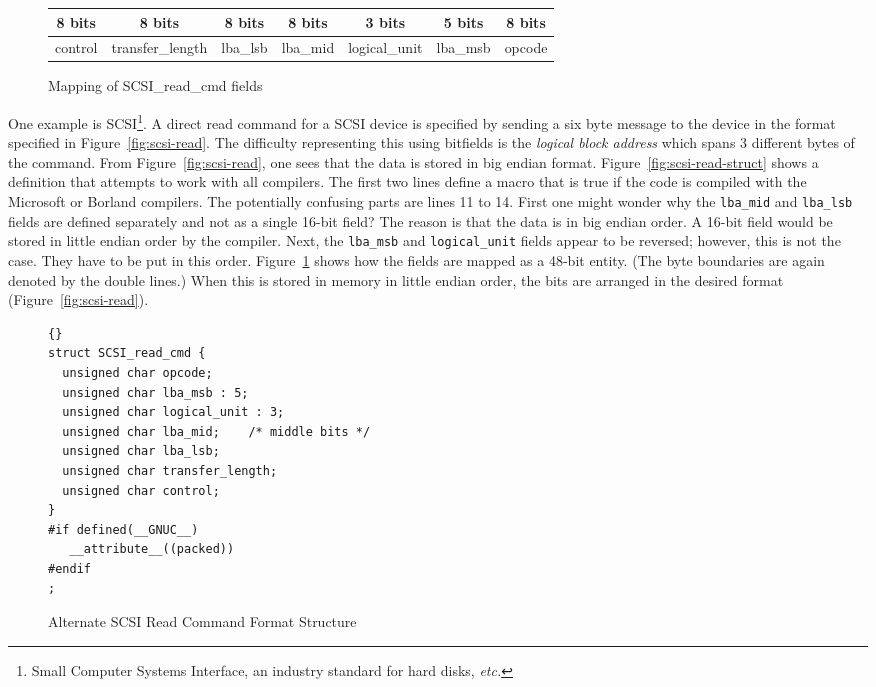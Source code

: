 \begin{figure}[t]
\centering
\begin{tabular}{|c||c||c||c||c|c||c|}
\multicolumn{1}{c}{8 bits} & \multicolumn{1}{c}{8 bits} 
& \multicolumn{1}{c}{8 bits} & \multicolumn{1}{c}{8 bits} 
& \multicolumn{1}{c}{3 bits} & \multicolumn{1}{c}{5 bits} 
& \multicolumn{1}{c}{8 bits} \\ \hline
control & transfer\_length & lba\_lsb  & lba\_mid &  
logical\_unit  & lba\_msb & opcode \\
\hline
\end{tabular}
\caption{Mapping of {\code SCSI\_read\_cmd} fields \label{fig:scsi-read-map}}
\end{figure}
One example is SCSI\footnote{Small Computer Systems Interface, an industry standard 
for hard disks, \emph{etc.}}. A direct read command for a SCSI device is specified
by sending a six byte message to the device in the format specified in 
Figure~\ref{fig:scsi-read}. The difficulty representing this using bitfields is the
\emph{logical block address} which spans 3 different bytes of the command. From
Figure~\ref{fig:scsi-read}, one sees that the data is stored in big endian format.
Figure~\ref{fig:scsi-read-struct} shows a definition that attempts to work with
all compilers. The first two lines define a macro that is true if the code is
compiled with the Microsoft or Borland compilers. The potentially confusing parts
are lines 11 to 14. First one might wonder why the \lstinline|lba_mid| and
\lstinline|lba_lsb| fields are defined separately and not as a single 16-bit
field? The reason is that the data is in big endian order. A 16-bit
field would be stored in little endian order by the compiler. Next,
the \lstinline|lba_msb| and \lstinline|logical_unit| fields appear to
be reversed; however, this is not the case. They have to be put in
this order. Figure~\ref{fig:scsi-read-map} shows how the fields are
mapped as a 48-bit entity. (The byte boundaries are again denoted by
the double lines.) When this is stored in memory in little endian
order, the bits are arranged in the desired format
(Figure~\ref{fig:scsi-read}).

\begin{figure}[t]
\begin{lstlisting}[frame=lrtb]{}
struct SCSI_read_cmd {
  unsigned char opcode;
  unsigned char lba_msb : 5;
  unsigned char logical_unit : 3;
  unsigned char lba_mid;    /* middle bits */
  unsigned char lba_lsb;
  unsigned char transfer_length;
  unsigned char control;
}
#if defined(__GNUC__)
   __attribute__((packed))
#endif
;
\end{lstlisting}
\caption{Alternate SCSI Read Command Format Structure\label{fig:scsi-read-struct2}
         }
\end{figure}

